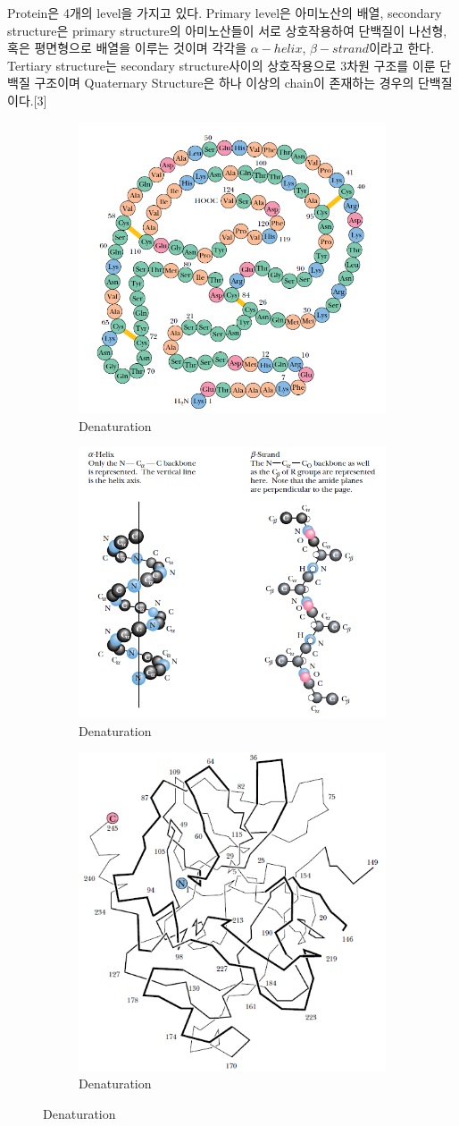 \documentclass[%
 reprint,
 amsmath,amssymb,
 aps,
]{revtex4-2}
\begin{document}
Protein은 4개의 level을 가지고 있다. Primary level은 아미노산의 배열, secondary structure은 primary structure의 아미노산들이 서로 상호작용하여 단백질이 나선형, 혹은 평면형으로 배열을 이루는 것이며 각각을 $\alpha-helix$, $\beta-strand$이라고 한다. Tertiary structure는 secondary structure사이의 상호작용으로 3차원 구조를 이룬 단백질 구조이며 Quaternary Structure은 하나 이상의 chain이 존재하는 경우의 단백질이다.[3]
\begin{figure}[htbp]
	\begin{subfigure}{0.4\textwidth}
		\includegraphics[width = 0.5\linewidth]{First.png}%
		\caption{\label{fig:First}Denaturation}
	\end{subfigure}

	\begin{subfigure}{0.4\textwidth}
		\includegraphics[width = 0.5\linewidth]{Second.png}%
		\caption{\label{fig:Second}Denaturation}
	\end{subfigure}

	\begin{subfigure}{0.4\textwidth}
		\includegraphics[width = 0.5\linewidth]{Third.png}%
		\caption{\label{fig:Third}Denaturation}
	\end{subfigure}


\end{figure}
\end{document}
